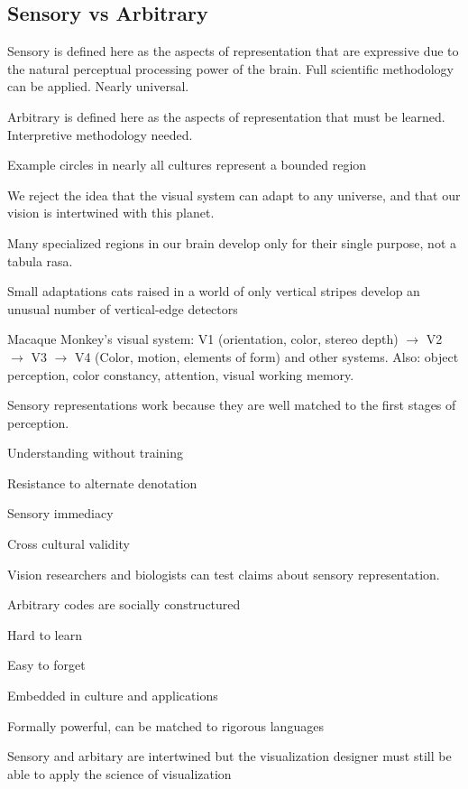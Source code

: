 \begin{mdframed}\begin{multicols}{2}
\subsection{Sensory vs Arbitrary}

\begin{compactdesc}
\item[Sensory] is defined here as the aspects of representation that are
    expressive due to the natural perceptual processing power of the brain.
    Full scientific methodology can be applied. Nearly universal.
\item[Arbitrary] is defined here as the aspects of representation that must
    be learned. Interpretive methodology needed.
\item[Example] circles in nearly all cultures represent a bounded region
\item[We reject the idea] that the visual system can adapt to any universe,
    and that our vision is intertwined with this planet.
\item[Many specialized] regions in our brain develop only for their single
    purpose, not a tabula rasa.
\item[Small adaptations] cats raised in a world of only vertical stripes
    develop an unusual number of vertical-edge detectors
\item[Macaque Monkey's] visual system: V1 (orientation, color, stereo depth)
    $\to$ V2 $\to$ V3 $\to$ V4 (Color, motion, elements of form) and other
    systems. Also: object perception, color constancy, attention, visual
    working memory.
\item[Sensory representations] work because they are well matched to the
    first stages of perception.
    \begin{compactenum}
    \item Understanding without training
    \item Resistance to alternate denotation
    \item Sensory immediacy
    \item Cross cultural validity
    \end{compactenum}
\item[Vision researchers and biologists] can test claims about sensory
    representation.
\item[Arbitrary codes] are socially constructured
    \begin{compactenum}
    \item Hard to learn
    \item Easy to forget
    \item Embedded in culture and applications
    \item Formally powerful, can be matched to rigorous languages
    \end{compactenum}
\item[Sensory and arbitary are intertwined] but the visualization designer must
    still be able to apply the science of visualization
\end{compactdesc}


\end{multicols}
\end{mdframed}
